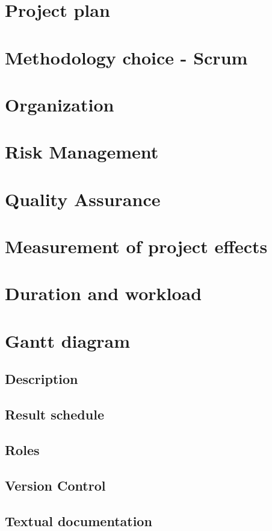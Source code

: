 \section{Project plan}
\section{Methodology choice - Scrum}
\section{Organization}
\section{Risk Management}
\section{Quality Assurance}
\section{Measurement of project effects}
\section{Duration and workload}
\section{Gantt diagram}
\subsection{Description}
\subsection{Result schedule}
\subsection{Roles}
\subsection{Version Control}
\subsection{Textual documentation}